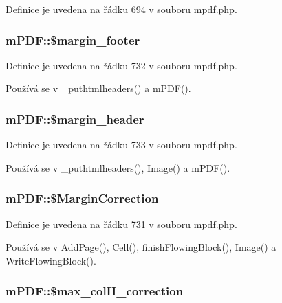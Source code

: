 Definice je uvedena na řádku 694 v souboru mpdf.\-php.

\hypertarget{classm_p_d_f_a8f94f907cccaf945fa9d8d002838199a}{
\subsubsection[{\$margin\-\_\-footer}]{\setlength{\rightskip}{0pt plus 5cm}m\-P\-D\-F\-::\$margin\-\_\-footer}}\label{classm_p_d_f_a8f94f907cccaf945fa9d8d002838199a}


Definice je uvedena na řádku 732 v souboru mpdf.\-php.



Používá se v \-\_\-puthtmlheaders() a m\-P\-D\-F().

\hypertarget{classm_p_d_f_ae6055d68ab3f623343f64e8a8589fab2}{
\subsubsection[{\$margin\-\_\-header}]{\setlength{\rightskip}{0pt plus 5cm}m\-P\-D\-F\-::\$margin\-\_\-header}}\label{classm_p_d_f_ae6055d68ab3f623343f64e8a8589fab2}


Definice je uvedena na řádku 733 v souboru mpdf.\-php.



Používá se v \-\_\-puthtmlheaders(), Image() a m\-P\-D\-F().

\hypertarget{classm_p_d_f_ae7c3fb9b5dba8965f8169a13d14f2b82}{
\subsubsection[{\$\-Margin\-Correction}]{\setlength{\rightskip}{0pt plus 5cm}m\-P\-D\-F\-::\$\-Margin\-Correction}}\label{classm_p_d_f_ae7c3fb9b5dba8965f8169a13d14f2b82}


Definice je uvedena na řádku 731 v souboru mpdf.\-php.



Používá se v Add\-Page(), Cell(), finish\-Flowing\-Block(), Image() a Write\-Flowing\-Block().

\hypertarget{classm_p_d_f_a0a7f7338a89569e4d23e15ef17a6a6e2}{
\subsubsection[{\$max\-\_\-col\-H\-\_\-correction}]{\setlength{\rightskip}{0pt plus 5cm}m\-P\-D\-F\-::\$max\-\_\-col\-H\-\_\-correction}}\label{classm_p_d_f_a0a7f7338a89569e4d23e15ef17a6a6e2}


